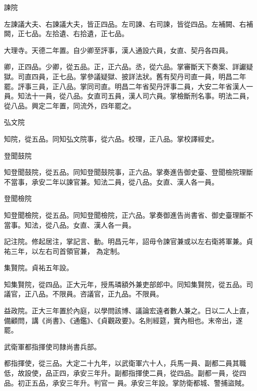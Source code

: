 \begin{pinyinscope}
 諫院



 左諫議大夫、右諫議大夫，皆正四品。左司諫、右司諫，皆從四品。左補闕、右補闕，正七品。左拾遺、右拾遺，正七品。



 大理寺。天德二年置。自少卿至評事，漢人通設六員，女直、契丹各四員。



 卿，正四品。少卿，從五品。正，正六品。丞，從六品。掌審斷天下奏案、詳讞疑獄。司直四員，正七品。掌參議疑獄、披詳法狀。舊有契丹司直一員，明昌二年罷。評事三員，正八品。掌同司直。明昌二年省契丹評事二員，大安二年省漢人一員。知法十一員，從八品。女直司五員，漢人司六員。掌檢斷刑名事。明法二員，從八品。興定二年置，同流外，四年罷之。



 弘文院



 知院，從五品。同知弘文院事，從六品。校理，正八品。掌校譯經史。



 登聞鼓院



 知登聞鼓院，從五品。同知登聞鼓院事，正六品。掌奏進告御史臺、登聞檢院理斷不當事，承安二年以諫官兼。知法二員，從八品。女直、漢人各一員。



 登聞檢院



 知登聞檢院，從五品。同知登聞檢院，正六品。掌奏御進告尚書省、御史臺理斷不當事。知法，從八品。女直、漢人各一員。



 記注院。修起居注，掌記言、動。明昌元年，詔毋令諫官兼或以左右衛將軍兼。貞祐三年，以左右司首領官兼，
 為定制。



 集賢院。貞祐五年設。



 知集賢院，從四品。正大元年，授馬璘額外兼吏部郎中。同知集賢院，從五品。司議官，正八品。不限員。咨議官，正九品。不限員。



 益政院。正大三年置於內庭，以學問該博、議論宏遠者數人兼之。日以二人上直，備顧問，講《尚書》、《通鑑》、《貞觀政要》。名則經筵，實內相也。末帝出，遂罷。



 武衛軍都指揮使司隸尚書兵部。



 都指揮使，從三品。大定二十九年，以武衛軍六十人，兵馬一員、副都二員其職低，故設使，品正四，承安三年升。副都指揮使二員，從四品。副都一員，從四品。初正五品，承安三年升。判官一
 員。承安三年設。掌防衛都城、警捕盜賊。




\end{pinyinscope}
